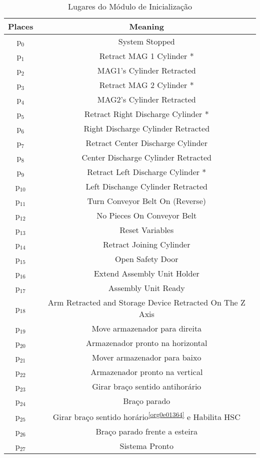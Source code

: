 \begin{table}[htbp]
\caption{Lugares do Módulo de Inicialização}
\centering
\begin{tabular}{c|c}
Places & Meaning\\
\hline
p\(_{\text{0}}\) & System Stopped\\
p\(_{\text{1}}\) & Retract MAG 1 Cylinder *\\
p\(_{\text{2}}\) & MAG1's Cylinder Retracted\\
p\(_{\text{3}}\) & Retract MAG 2 Cylinder *\\
p\(_{\text{4}}\) & MAG2's Cylinder Retracted\\
p\(_{\text{5}}\) & Retract Right Discharge Cylinder *\\
p\(_{\text{6}}\) & Right Discharge Cylinder Retracted\\
p\(_{\text{7}}\) & Retract Center Discharge Cylinder\\
p\(_{\text{8}}\) & Center Discharge Cylinder Retracted\\
p\(_{\text{9}}\) & Retract Left Discharge Cylinder *\\
p\(_{\text{10}}\) & Left Dischange Cylinder Retracted\\
p\(_{\text{11}}\) & Turn Conveyor Belt On (Reverse)\\
p\(_{\text{12}}\) & No Pieces On Conveyor Belt\\
p\(_{\text{13}}\) & Reset Variables\footnotemark\\
p\(_{\text{14}}\) & Retract Joining Cylinder\\
p\(_{\text{15}}\) & Open Safety Door\\
p\(_{\text{16}}\) & Extend Assembly Unit Holder\\
p\(_{\text{17}}\) & Assembly Unit Ready\\
p\(_{\text{18}}\) & Arm Retracted and Storage Device Retracted On The Z Axis\\
p\(_{\text{19}}\) & Move armazenador para direita\\
p\(_{\text{20}}\) & Armazenador pronto na horizontal\\
p\(_{\text{21}}\) & Mover armazenador para baixo\\
p\(_{\text{22}}\) & Armazenador pronto na vertical\\
p\(_{\text{23}}\) & Girar braço sentido antihorário\footnotemark\\
p\(_{\text{24}}\) & Braço parado\\
p\(_{\text{25}}\) & Girar braço sentido horário\textsuperscript{\ref{org0e01364}} e Habilita HSC\\
p\(_{\text{26}}\) & Braço parado frente a esteira\\
p\(_{\text{27}}\) & Sistema Pronto\\
\end{tabular}
\end{table}

